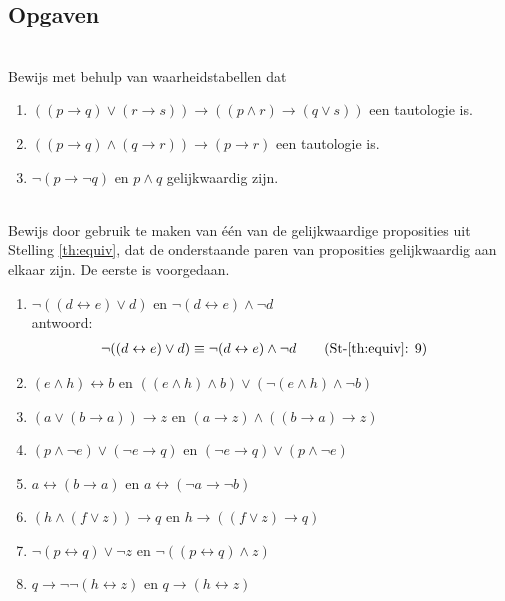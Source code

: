 \subsection{Opgaven}
\begin{exercise}\mbox{}\\
Bewijs met behulp van waarheidstabellen dat
\begin{enumerate}[label=\textit{\alph*.}]
\item $((p\rightarrow q)\lor(r\rightarrow s))\rightarrow((p\land r)\rightarrow(q\lor s))$ een tautologie is.
\item $((p\rightarrow q)\land(q\rightarrow r))\rightarrow(p\rightarrow r)$ een tautologie is.
\item $\neg(p\rightarrow\neg q)$ en $p\land q$ gelijkwaardig zijn.
\end{enumerate}
\end{exercise}

\begin{exercise}\mbox{}\\
Bewijs door gebruik te maken van één van de gelijkwaardige proposities uit Stelling \ref{th:equiv}, dat de onderstaande paren van proposities gelijkwaardig aan elkaar zijn. De eerste is voorgedaan.
\begin{enumerate}[label=\textit{\alph*.}]
\item $\neg ((d\leftrightarrow e)\vee d)$ en $\neg (d\leftrightarrow e) \wedge \neg d$ \\
antwoord:
\begin{align}
\neg ((d\leftrightarrow e)\vee d) &\equiv \neg (d\leftrightarrow e)\wedge \neg d  \tag{St-\ref{th:equiv}: 9}
\end{align}
\item $(e\land h) \leftrightarrow b$ en $((e\land h) \land b) \lor (\neg (e\land h)\land \neg b)$
\item $(a\lor (b\rightarrow a)) \rightarrow z$ en $(a\rightarrow z)\land ((b\rightarrow a) \rightarrow z)$
\item $(p\land \neg e)\lor (\neg e \rightarrow q)$ en $(\neg e\rightarrow q)\lor (p\land \neg e)$
\item $a \leftrightarrow (b\rightarrow a)$ en $a \leftrightarrow (\neg a\rightarrow \neg b)$ 
\item $(h \land (f\lor z))\rightarrow q$ en $h\rightarrow ((f\lor z) \rightarrow q)$  
\item $\neg (p\leftrightarrow q)\lor \neg z$ en $\neg ((p\leftrightarrow q) \land z)$  
\item $q \rightarrow \neg \neg (h \leftrightarrow z) $ en $q \rightarrow (h \leftrightarrow z)$ 
\end{enumerate}
\end{exercise}

